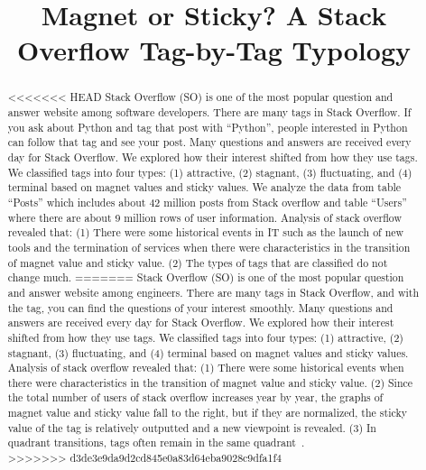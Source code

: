 \documentclass[conference]{IEEEtran}
\begin{document}
\title{Magnet or Sticky? A Stack Overflow Tag-by-Tag Typology\\
}

\maketitle

\begin{abstract}
<<<<<<< HEAD
Stack Overflow (SO) is one of the most popular question and answer website among software developers. There are many tags in Stack Overflow.  If you ask about Python and tag that post with ``Python'', people interested in Python can follow that tag and see your post. Many questions and answers are received every day for Stack Overflow. We explored how their interest shifted from how they use tags. We classified tags into four types: (1) attractive, (2) stagnant, (3) fluctuating, and (4) terminal based on magnet values and sticky values. We analyze the data from table ``Posts'' which includes about 42 million posts from Stack overflow and table ``Users'' where there are about 9 million rows of user information. Analysis of stack overflow revealed that: 
(1) There were some historical events in IT  such as the launch of new tools and the termination of services when there were characteristics in the transition of magnet value and sticky value.
(2) The types of tags that are classified do not change much.
=======
Stack Overflow (SO) is one of the most popular question and answer website among engineers. There are many tags in Stack Overflow, and with the tag, you can find the questions of your interest smoothly. Many questions and answers are received every day for Stack Overflow. We explored how their interest shifted from how they use tags. We classified tags into four types: (1) attractive, (2) stagnant, (3) fluctuating, and (4) terminal based on magnet values and sticky values. Analysis of stack overflow revealed that: 
(1) There were some historical events when there were characteristics in the transition of magnet value and sticky value.
(2) Since the total number of users of stack overflow increases year by year, the graphs of magnet value and sticky value fall to the right, but if they are normalized, the sticky value of the tag is relatively outputted and a new viewpoint is revealed.
(3) In quadrant transitions, tags often remain in the same quadrant~\cite{yamashita2014magnet}.\\
>>>>>>> d3de3e9da9d2cd845e0a83d64eba9028c9dfa1f4
\end{abstract}
\end{document}
